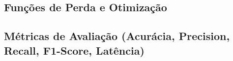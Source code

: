 \subsection{Funções de Perda e Otimização}
\label{subsec:funcoes_perda}

\subsection{Métricas de Avaliação (Acurácia, Precision, Recall, F1-Score, Latência)}
\label{subsec:metricas_avaliacao}
